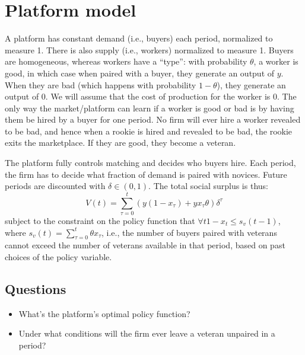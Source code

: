  

\section{Platform model}
A platform has constant demand (i.e., buyers) each period, normalized to measure 1. There is also supply (i.e., workers) normalized to measure 1. Buyers are homogeneous, whereas workers have a ``type'': with probability $\theta$, a worker is good, in which case when paired with a buyer, they generate an output of $y$. When they are bad (which happens with probability $1-\theta$), they generate an output of $0$. We will assume that the cost of production for the worker is $0$. The only way the market/platform can learn if a worker is good or bad is by having them be hired by a buyer for one period. No firm will ever hire a worker revealed to be bad, and hence when a rookie is hired and revealed to be bad, the rookie exits the marketplace. If they are good, they become a veteran. 

The platform fully controls matching and decides who buyers hire. Each period, the firm has to decide what fraction of demand is paired with novices. Future periods are discounted with $\delta \in (0,1)$. The total social surplus is thus: 
\begin{equation} 
V(t) = \sum_{\tau=0}^t \left(y(1-x_\tau) + yx_\tau\theta\right)\delta^\tau
\end{equation}
subject to the constraint on the policy function that $\forall t 1-x_t \le s_v(t-1)$, where $s_v(t) = \sum_{\tau = 0}^t \theta x_\tau$, i.e., the number of buyers paired with veterans cannot exceed the number of veterans available in that period, based on past choices of the policy variable. 

\subsection{Questions}

\begin{itemize} 
\item What's the platform's optimal policy function? 
\item Under what conditions will the firm ever leave a veteran unpaired in a period?
\end{itemize} 

